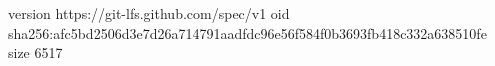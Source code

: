 version https://git-lfs.github.com/spec/v1
oid sha256:afc5bd2506d3e7d26a714791aadfdc96e56f584f0b3693fb418c332a638510fe
size 6517
